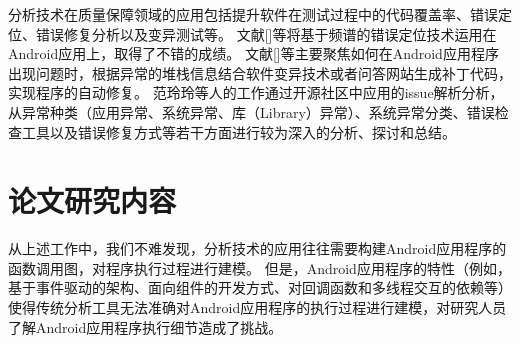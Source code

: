 


分析技术在质量保障领域的应用包括提升软件在测试过程中的代码覆盖率\cite{azim2013targeted,yang2013grey,su2016fsmdroid,androidtest2}、错误定位\cite{mirzaei2015exception,machado2013mzoltar}、错误修复分析\cite{tan2018repairing,QingGaoASE15}以及变异测试\cite{MutationOperatorsAndroid,deng2015towards,linares2017enabling}等。
文献[]等将基于频谱的错误定位技术运用在Android应用上，取得了不错的成绩。
文献[]等主要聚焦如何在Android应用程序出现问题时，根据异常的堆栈信息结合软件变异技术或者问答网站生成补丁代码，实现程序的自动修复。
范玲玲等人的工作\cite{fan2018large}通过开源社区中应用的issue解析分析，从异常种类（应用异常、系统异常、库（Library）异常）、系统异常分类、错误检查工具以及错误修复方式等若干方面进行较为深入的分析、探讨和总结。






\section{论文研究内容}


从上述工作中，我们不难发现，分析技术的应用往往需要构建Android应用程序的函数调用图，对程序执行过程进行建模。
但是，Android应用程序的特性（例如，基于事件驱动的架构、面向组件的开发方式、对回调函数和多线程交互的依赖等）使得传统分析工具无法准确对Android应用程序的执行过程进行建模，对研究人员了解Android应用程序执行细节造成了挑战。


